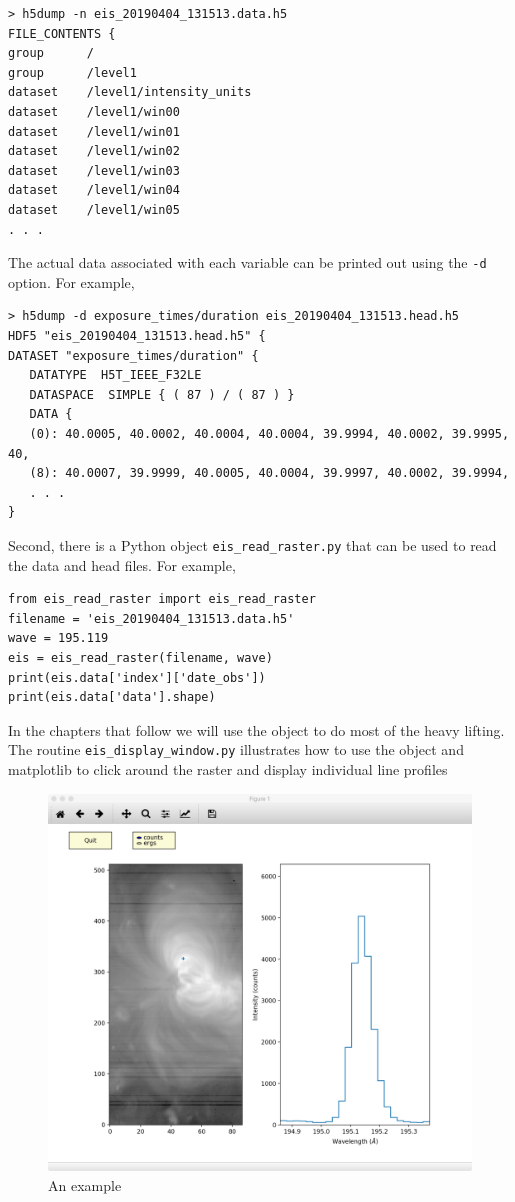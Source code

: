 \begin{lstlisting}
> h5dump -n eis_20190404_131513.data.h5
FILE_CONTENTS {
group      /
group      /level1
dataset    /level1/intensity_units
dataset    /level1/win00
dataset    /level1/win01
dataset    /level1/win02
dataset    /level1/win03
dataset    /level1/win04
dataset    /level1/win05
. . .
\end{lstlisting}
The actual data associated with each variable can be printed out using the \verb+-d+ option. For
example,
\begin{lstlisting}
> h5dump -d exposure_times/duration eis_20190404_131513.head.h5
HDF5 "eis_20190404_131513.head.h5" {
DATASET "exposure_times/duration" {
   DATATYPE  H5T_IEEE_F32LE
   DATASPACE  SIMPLE { ( 87 ) / ( 87 ) }
   DATA {
   (0): 40.0005, 40.0002, 40.0004, 40.0004, 39.9994, 40.0002, 39.9995, 40,
   (8): 40.0007, 39.9999, 40.0005, 40.0004, 39.9997, 40.0002, 39.9994,
   . . .
}
\end{lstlisting}
Second, there is a Python object \verb+eis_read_raster.py+ that can be used to read the data and head
files. For example,
\begin{lstlisting}
from eis_read_raster import eis_read_raster
filename = 'eis_20190404_131513.data.h5'
wave = 195.119
eis = eis_read_raster(filename, wave)
print(eis.data['index']['date_obs'])
print(eis.data['data'].shape)
\end{lstlisting}
In the chapters that follow we will use the object to do most of the heavy lifting. The routine
\verb+eis_display_window.py+ illustrates how to use the object and matplotlib to click around the
raster and display individual line profiles

\begin{figure}[t]
  \centerline{\includegraphics[clip,width=\linewidth]{figures/eis_display_window.pdf}}
  \caption{An example }
  \label{fig:matplotlib}
\end{figure}
